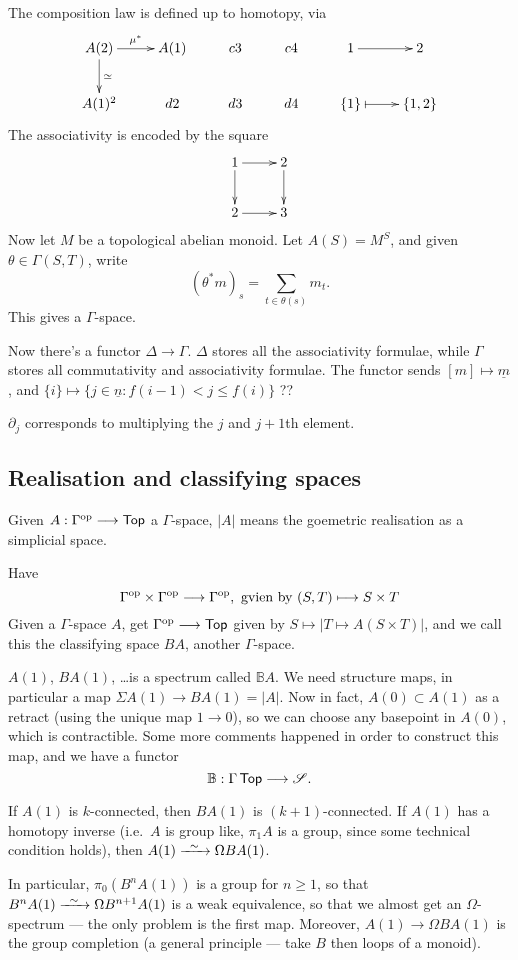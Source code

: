 \documentclass[11pt]{article}
\begin{document}
\begin{JandrGammaPractice}
The composition law is defined up to homotopy, via
\[\xymatrix{
\ar[d]^{\simeq} A(2)\ar[r]^{\mu^*}& A(1)& c3& c4& 1\ar[r]& 2\\
 A(1)^2& d2& d3& d4& \{1\}\ar@{|->}[r]& \{1,2\}\\
}\]
The associativity is encoded by the square
\[\xymatrix{
 1\ar[d]\ar[r]&2\ar[d]\\
 2\ar[r]& 3
}\]
Now let $M$ be a topological abelian monoid. Let $A(S)=M^S$, and given $\theta\in\Gamma(S,T)$, write
\[(\theta^*m)_s=\sum_{t\in \theta(s)}m_t.\]
This gives a $\Gamma$-space.

Now there's a functor $\Delta\to\Gamma$. $\Delta$ stores all the associativity formulae, while $\Gamma$ stores all commutativity and associativity formulae. The functor sends
$[m]\mapsto \underline{m}$, and $\{i\}\mapsto \{j\in\underline{n}:f(i-1)<j\leq f(i)\}$ ??

$\partial_j$ corresponds to multiplying the $j$ and $j+1$th element.
\subsection*{Realisation and classifying spaces}
Given $A:\Gamma^{\textup{op}}\longrightarrow\operatorname{{\mathsf{Top}}}$ a $\Gamma$-space, $|A|$ means the goemetric realisation as a simplicial space.

Have
\[\Gamma^{\textup{op}}\times\Gamma^{\textup{op}}\longrightarrow\Gamma^{\textup{op}},\text{ gvien by }(S,T)\longmapsto S\times T\]
Given a $\Gamma$-space $A$, get $\Gamma^{\textup{op}}\longrightarrow\operatorname{{\mathsf{Top}}}$ given by $S \mapsto |T\mapsto A(S\times T)|$, and we call this the classifying space $BA$, another $\Gamma$-space.

$A(1)$, $BA(1)$, \ldots is a spectrum called $\mathbb{B}A$. We need structure maps, in particular a map $\Sigma A(1)\to BA(1)=|A|$. Now in fact, $A(0)\subset A(1)$ as a retract (using the unique map $1\to 0$), so we can choose any basepoint in $A(0)$, which is contractible. Some more comments happened in order to construct this map, and we have a functor
\[\mathbb{B}:\Gamma\operatorname{{\mathsf{Top}}}\longrightarrow\mathscr{S}.\]
\begin{prop*}
If $A(1)$ is $k$-connected, then $BA(1)$ is $(k+1)$-connected. If $A(1)$ has a homotopy inverse (i.e.\ $A$ is group like, \Iff $\pi_1A$ is a group, since some technical condition holds), then $A(1)\weakequiv \Omega BA(1)$.
\end{prop*}
\noindent In particular, $\pi_0(B^nA(1))$ is a group for $n\geq1$, so that $B^nA(1)\weakequiv \Omega B^{n+1}A(1)$ is a weak equivalence, so that we almost get an $\Omega$-spectrum --- the only problem is the first map. Moreover, $A(1)\to\Omega BA(1)$ is the group completion (a general principle --- take $B$ then loops of a monoid).

\end{JandrGammaPractice}
\end{document}
